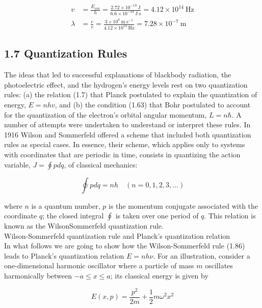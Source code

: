 \documentclass[10pt]{article}
\begin{document}
\begin{align*}
v & =\frac{E_{i o n}}{h}=\frac{2.72 \times 10^{-19} \mathrm{~J}}{6.6 \times 10^{-34} \mathrm{~J} \mathrm{~s}}=4.12 \times 10^{14} \mathrm{~Hz}  \tag{1.84}\\
\lambda & =\frac{c}{v}=\frac{3 \times 10^{8} \mathrm{~m} \mathrm{~s}^{-1}}{4.12 \times 10^{14} \mathrm{~Hz}}=7.28 \times 10^{-7} \mathrm{~m} \tag{1.85}
\end{align*}


\subsection*{1.7 Quantization Rules}
The ideas that led to successful explanations of blackbody radiation, the photoelectric effect, and the hydrogen's energy levels rest on two quantization rules: (a) the relation (1.7) that Planck postulated to explain the quantization of energy, $E=n h v$, and (b) the condition (1.63) that Bohr postulated to account for the quantization of the electron's orbital angular momentum, $L=n \hbar$. A number of attempts were undertaken to understand or interpret these rules. In 1916 Wilson and Sommerfeld offered a scheme that included both quantization rules as special cases. In essence, their scheme, which applies only to systems with coordinates that are periodic in time, consists in quantizing the action variable, $J=\oint p d q$, of classical mechanics:


\begin{equation*}
\oint p d q=n h \quad(n=0,1,2,3, \ldots) \tag{1.86}
\end{equation*}


where $n$ is a quantum number, $p$ is the momentum conjugate associated with the coordinate $q$; the closed integral $\oint$ is taken over one period of $q$. This relation is known as the WilsonSommerfeld quantization rule.\\
Wilson-Sommerfeld quantization rule and Planck's quantization relation\\
In what follows we are going to show how the Wilson-Sommerfeld rule (1.86) leads to Planck's quantization relation $E=n h \nu$. For an illustration, consider a one-dimensional harmonic oscillator where a particle of mass $m$ oscillates harmonically between $-a \leq x \leq a$; its classical energy is given by


\begin{equation*}
E(x, p)=\frac{p^{2}}{2 m}+\frac{1}{2} m \omega^{2} x^{2} \tag{1.87}
\end{equation*}
\end{document}
